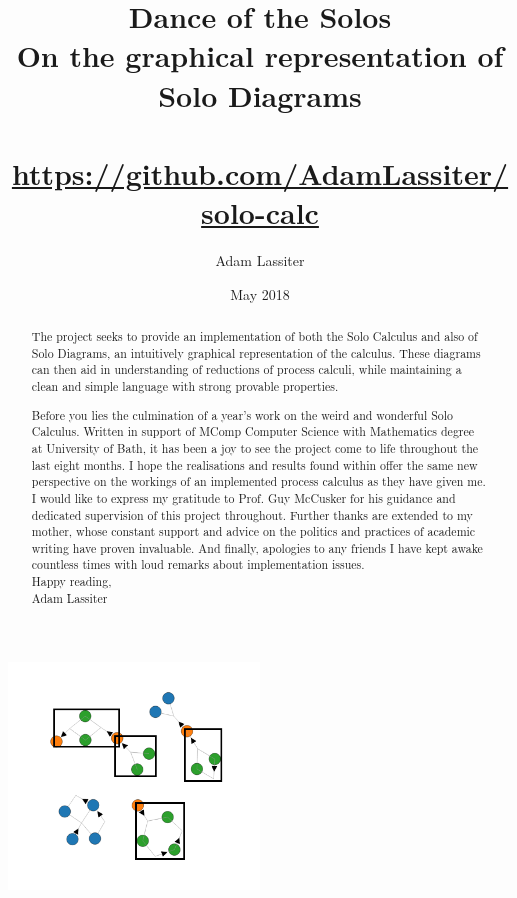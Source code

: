 \documentclass{article}
\title{Dance of the Solos \\
    \large On the graphical representation of Solo Diagrams \\~\\
    \small \url{https://github.com/AdamLassiter/solo-calc}}
\author{Adam Lassiter}
\date{May 2018}
\begin{document}
    
    \maketitle
    \vspace{\fill}
    \begin{abstract}
        The project seeks to provide an implementation of both the Solo Calculus and also of Solo Diagrams, an intuitively graphical representation of the calculus.
        These diagrams can then aid in understanding of reductions of process calculi, while maintaining a clean and simple language with strong provable properties.
    \end{abstract}
    \vspace{\fill}
    \begin{center}
        \includegraphics[width=0.5\textwidth]{diagram.png}
    \end{center}
    \vspace{\fill}
    \pagebreak
    
    \renewcommand{\abstractname}{Preface}
    \null\vspace{\fill}
    \begin{abstract}
        Before you lies the culmination of a year's work on the weird and wonderful Solo Calculus.
        Written in support of MComp Computer Science with Mathematics degree at University of Bath, it has been a joy to see the project come to life throughout the last eight months.
        I hope the realisations and results found within offer the same new perspective on the workings of an implemented process calculus as they have given me.\\

        I would like to express my gratitude to Prof. Guy McCusker for his guidance and dedicated supervision of this project throughout.
        Further thanks are extended to my mother, whose constant support and advice on the politics and practices of academic writing have proven invaluable.
        And finally, apologies to any friends I have kept awake countless times with loud remarks about implementation issues.\\

        Happy reading,\\

        Adam Lassiter
    \end{abstract}
    \vspace{\fill}
    \pagebreak
    
\end{document}
